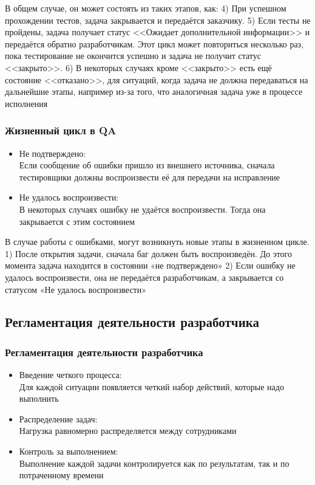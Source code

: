 \documentclass{../industrial-development}
\begin{document}
\lecturenotes
В общем случае, он может состоять из таких этапов, как:
4) При успешном прохождении тестов, задача закрывается и передаётся заказчику.
5) Если тесты не пройдены, задача получает статус <<Ожидает дополнительной информации>> и передаётся обратно разработчикам. Этот цикл может повториться несколько раз, пока тестирование не окончится успешно и задача не получит статус <<закрыто>>.
6) В некоторых случаях кроме <<закрыто>> есть ещё состояние <<отказано>>, для ситуаций, когда задача не должна передаваться на дальнейшие этапы, например из-за того, что аналогичная задача уже в процессе исполнения

\begin{frame} \frametitle{Жизненный цикл в QA}
	\begin{itemize}
		\item Не подтверждено:\\
		Если сообщение об ошибки пришло из внешнего источника, сначала тестировщики должны воспроизвести её для передачи на исправление
		\item Не удалось воспроизвести:\\
		В некоторых случаях ошибку не удаётся воспроизвести. Тогда она закрывается с этим состоянием
	\end{itemize}
\end{frame}

\lecturenotes

В случае работы с ошибками, могут возникнуть новые этапы в жизненном цикле.
1) После открытия задачи, сначала баг должен быть воспроизведён. До этого момента задача находится в состоянии «не подтверждено»
2) Если ошибку не удалось воспроизвести, она не передаётся разработчикам, а закрывается со статусом «Не удалось воспроизвести»

\subsection{Регламентация деятельности разработчика}

\begin{frame} \frametitle{Регламентация деятельности разработчика}
	\begin{itemize}
		\item Введение четкого процесса:\\
		Для каждой ситуации появляется четкий набор действий, которые надо выполнить		
		\item Распределение задач:\\
		Нагрузка равномерно распределяется между сотрудниками
		\item Контроль за выполнением:\\
		Выполнение каждой задачи контролируется как по результатам, так и по потраченному времени
	\end{itemize}
\end{frame}
\end{document}
